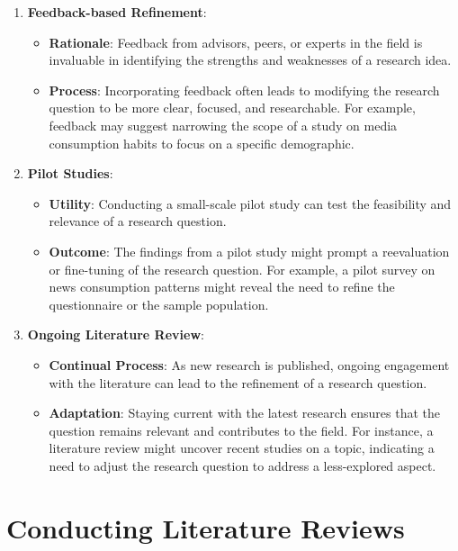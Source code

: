 \documentclass[
]{book}
\providecommand{\tightlist}{%
  \setlength{\itemsep}{0pt}\setlength{\parskip}{0pt}}
\begin{document}
\begin{enumerate}
\def\labelenumi{\arabic{enumi}.}
\tightlist
\item
  \textbf{Feedback-based Refinement}:

  \begin{itemize}
  \tightlist
  \item
    \textbf{Rationale}: Feedback from advisors, peers, or experts in the field is invaluable in identifying the strengths and weaknesses of a research idea.
  \item
    \textbf{Process}: Incorporating feedback often leads to modifying the research question to be more clear, focused, and researchable. For example, feedback may suggest narrowing the scope of a study on media consumption habits to focus on a specific demographic.
  \end{itemize}
\item
  \textbf{Pilot Studies}:

  \begin{itemize}
  \tightlist
  \item
    \textbf{Utility}: Conducting a small-scale pilot study can test the feasibility and relevance of a research question.
  \item
    \textbf{Outcome}: The findings from a pilot study might prompt a reevaluation or fine-tuning of the research question. For example, a pilot survey on news consumption patterns might reveal the need to refine the questionnaire or the sample population.
  \end{itemize}
\item
  \textbf{Ongoing Literature Review}:

  \begin{itemize}
  \tightlist
  \item
    \textbf{Continual Process}: As new research is published, ongoing engagement with the literature can lead to the refinement of a research question.
  \item
    \textbf{Adaptation}: Staying current with the latest research ensures that the question remains relevant and contributes to the field. For instance, a literature review might uncover recent studies on a topic, indicating a need to adjust the research question to address a less-explored aspect.
  \end{itemize}
\end{enumerate}

\hypertarget{conducting-literature-reviews}{%
\chapter*{Conducting Literature Reviews}\label{conducting-literature-reviews}}
\end{document}
